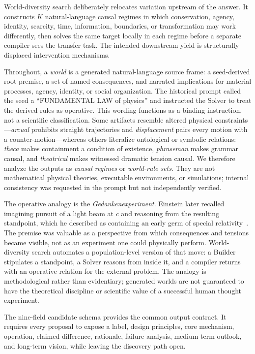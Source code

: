 \documentclass[11pt,a4paper]{article}
\begin{document}
World-diversity search deliberately relocates variation upstream of the answer. It constructs $K$ natural-language causal regimes in which conservation, agency, identity, scarcity, time, information, boundaries, or transformation may work differently, then solves the same target locally in each regime before a separate compiler sees the transfer task. The intended downstream yield is structurally displaced intervention mechanisms.

Throughout, a \emph{world} is a generated natural-language source frame: a seed-derived root premise, a set of named consequences, and narrated implications for material processes, agency, identity, or social organization. The historical prompt called the seed a ``FUNDAMENTAL LAW of physics'' and instructed the Solver to treat the derived rules as operative. This wording functions as a binding instruction, not a scientific classification. Some artifacts resemble altered physical constraints---\emph{arcual} prohibits straight trajectories and \emph{displacement} pairs every motion with a counter-motion---whereas others literalize ontological or symbolic relations: \emph{theca} makes containment a condition of existence, \emph{phraseman} makes grammar causal, and \emph{theatrical} makes witnessed dramatic tension causal. We therefore analyze the outputs as \emph{causal regimes} or \emph{world-rule sets}. They are not mathematical physical theories, executable environments, or simulations; internal consistency was requested in the prompt but not independently verified.

The operative analogy is the \emph{Gedankenexperiment}. Einstein later recalled imagining pursuit of a light beam at $c$ and reasoning from the resulting standpoint, which he described as containing an early germ of special relativity~\cite{einstein1949autobiographical}. The premise was valuable as a perspective from which consequences and tensions became visible, not as an experiment one could physically perform. World-diversity search automates a population-level version of that move: a Builder stipulates a standpoint, a Solver reasons from inside it, and a compiler returns with an operative relation for the external problem. The analogy is methodological rather than evidentiary; generated worlds are not guaranteed to have the theoretical discipline or scientific value of a successful human thought experiment.

The nine-field candidate schema provides the common output contract. It requires every proposal to expose a label, design principles, core mechanism, operation, claimed difference, rationale, failure analysis, medium-term outlook, and long-term vision, while leaving the discovery path open.
\end{document}
